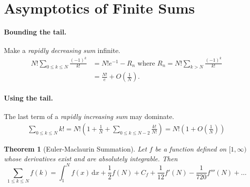 \documentclass{article}
\newtheorem{theorem}{Theorem}
\begin{document}
\section{Asymptotics of Finite Sums}

\paragraph{Bounding the tail.} Make a \emph{rapidly decreasing sum} infinite.
\begin{align*}
  N!\sum_{0 \leq k \leq N}\frac{(-1)^k}{k!} &= N!e^{-1} - R_n \text{ where }
    R_n = N!\sum_{k > N}\frac{(-1)^k}{k!} \\
    &= \frac{N!}{e} + O\left(\frac{1}{N}\right).
\end{align*}

\paragraph{Using the tail.} The last term of a \emph{rapidly increasing sum}
may dominate. \begin{align*}
  \sum_{0 \leq k \leq N}k! = N!\left(1 + \frac{1}{N} + \sum_{0 \leq k \leq N -
    2}\frac{k!}{N!}\right) = N!\left(1 + O\left(\frac{1}{N}\right)\right)
\end{align*}

\begin{theorem}[Euler-Maclaurin Summation]
  Let $f$ be a function defined on $[1, \infty)$ whose derivatives exist and
  are absolutely integrable. Then \begin{equation*}
    \sum_{1 \leq k \leq N}f(k) = \int_1^N f(x)\,\mathrm{d}x + \frac{1}{2}f(N) +
      C_f + \frac{1}{12}f'(N) - \frac{1}{720}f'''(N) + \ldots
  \end{equation*}
\end{theorem}
\end{document}
